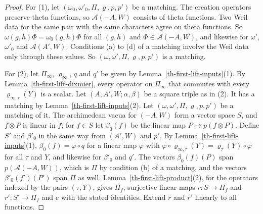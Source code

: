 \begin{proof}
For (1), let $(\omega_0,\omega'_0,\Pi,\varrho,p,p')$ be a matching. The
creation operators preserve theta functions, so $\mathcal A(-A,W)$ consists of
theta functions. Two Weil data for the same pair with the same characters
agree on theta functions. So $\omega(g,h)\Phi=\omega_0(g,h)\Phi$ for all
$(g,h)$ and $\Phi\in\mathcal A(-A,W)$, and likewise for $\omega'$, $\omega'_0$
and $\mathcal A(A',W)$. Conditions (a) to (d) of a matching involve the Weil
data only through these values. So $(\omega,\omega',\Pi,\varrho,p,p')$ is a
matching.

For (2), let $\Pi_\infty$, $\varrho_\infty$, $q$ and $q'$ be given by
Lemma~\ref{th-first-lift-inputs}(1). By Lemma~\ref{th-first-lift-dixmier},
every operator on $\Pi_\infty$ that commutes with every
$\varrho_{\infty,\tau}(Y)$ is a scalar. Let $(A,A',W;\alpha,\beta)$ be a square
triple as in (2). It has a matching by Lemma~\ref{th-first-lift-inputs}(2).
Let $(\omega,\omega',\Pi,\varrho,p,p')$ be a matching of it. The archimedean
vacua for $(-A,W)$ form a vector space $S$, and $f\otimes P$ is linear in $f$;
for $f\in S$ let $\beta_0(f)$ be the linear map $P\mapsto p(f\otimes P)$.
Define $S'$ and $\beta'_0$ in the same way from $(A',W)$ and $p'$. By
Lemma~\ref{th-first-lift-inputs}(1), $\beta_0(f)=\varphi\circ q$ for a linear
map $\varphi$ with $\varphi\circ\varrho_{\infty,\tau}(Y)=\varrho_\tau(Y)\circ\varphi$
for all $\tau$ and $Y$, and likewise for $\beta'_0$ and $q'$. The vectors
$\beta_0(f)(P)$ span $p(\mathcal A(-A,W))$, which is $\Pi$ by condition (b) of
a matching, and the vectors $\beta'_0(f')(P')$ span $\Pi$ as well.
Lemma~\ref{th-first-lift-product}(2), for the operators indexed by the pairs
$(\tau,Y)$, gives $\Pi_f$, surjective linear maps $r\colon S\to\Pi_f$ and
$r'\colon S'\to\Pi_f$ and $e$ with the stated identities. Extend $r$ and $r'$
linearly to all functions.
\end{proof}

